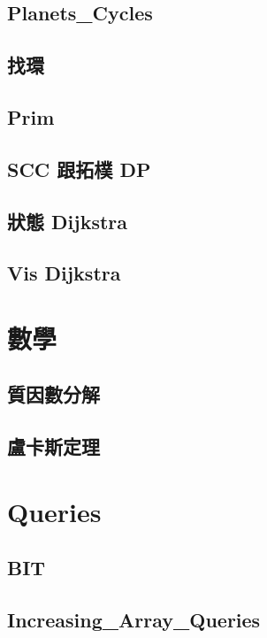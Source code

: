 \subsection{Planets_Cycles} 

\subsection{找環} 

\subsection{Prim}

\subsection{SCC 跟拓樸 DP}

\subsection{狀態 Dijkstra}

\subsection{Vis Dijkstra}


\section{數學}
\subsection{質因數分解} 

\subsection{盧卡斯定理} 


\section{Queries}
\subsection{BIT} 

\subsection{Increasing_Array_Queries}

